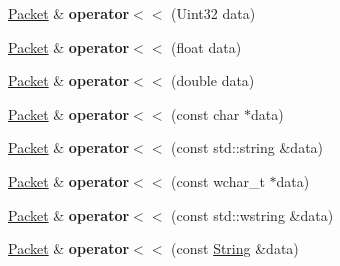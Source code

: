 \begin{DoxyCompactItemize}
\item 
\hypertarget{classsf_1_1_packet_afb113b73749efb662a75deb98257ad34}{\hyperlink{classsf_1_1_packet}{Packet} \& {\bfseries operator$<$$<$} (Uint32 data)}\label{classsf_1_1_packet_afb113b73749efb662a75deb98257ad34}

\item 
\hypertarget{classsf_1_1_packet_a76d31c4f864253a7e9b53701b4660fe5}{\hyperlink{classsf_1_1_packet}{Packet} \& {\bfseries operator$<$$<$} (float data)}\label{classsf_1_1_packet_a76d31c4f864253a7e9b53701b4660fe5}

\item 
\hypertarget{classsf_1_1_packet_a3b3077720a486b569ac8e7dec638a3f0}{\hyperlink{classsf_1_1_packet}{Packet} \& {\bfseries operator$<$$<$} (double data)}\label{classsf_1_1_packet_a3b3077720a486b569ac8e7dec638a3f0}

\item 
\hypertarget{classsf_1_1_packet_a67c9985f7b3d6e90886e56e309280a9d}{\hyperlink{classsf_1_1_packet}{Packet} \& {\bfseries operator$<$$<$} (const char $\ast$data)}\label{classsf_1_1_packet_a67c9985f7b3d6e90886e56e309280a9d}

\item 
\hypertarget{classsf_1_1_packet_a59a21671caaa69da5d47c54b50e1eb54}{\hyperlink{classsf_1_1_packet}{Packet} \& {\bfseries operator$<$$<$} (const std\+::string \&data)}\label{classsf_1_1_packet_a59a21671caaa69da5d47c54b50e1eb54}

\item 
\hypertarget{classsf_1_1_packet_a6f7c6a9ce795fac342ea937896d98016}{\hyperlink{classsf_1_1_packet}{Packet} \& {\bfseries operator$<$$<$} (const wchar\+\_\+t $\ast$data)}\label{classsf_1_1_packet_a6f7c6a9ce795fac342ea937896d98016}

\item 
\hypertarget{classsf_1_1_packet_a9f3401d038470f629d0c2c6be928a14b}{\hyperlink{classsf_1_1_packet}{Packet} \& {\bfseries operator$<$$<$} (const std\+::wstring \&data)}\label{classsf_1_1_packet_a9f3401d038470f629d0c2c6be928a14b}

\item 
\hypertarget{classsf_1_1_packet_abc17272df082a36b202e10045bd9e220}{\hyperlink{classsf_1_1_packet}{Packet} \& {\bfseries operator$<$$<$} (const \hyperlink{classsf_1_1_string}{String} \&data)}\label{classsf_1_1_packet_abc17272df082a36b202e10045bd9e220}

\end{DoxyCompactItemize}
